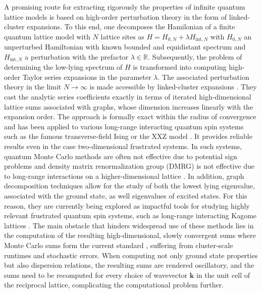\documentclass[]{amsart}
\numberwithin{mythm}{section}
\begin{document}
A promising route for extracting rigorously the properties of infinite quantum lattice models is based on high-order perturbation theory in the form of linked-cluster expansions. To this end, one decomposes the Hamilonian of a finite quantum lattice model with $N$ lattice sites as $H=H_{0,N}+\lambda H_{\mathrm{int},N}$ with $H_{0,N}$ an unperturbed Hamiltonian with known bounded and equidistant spectrum and $H_{\mathrm{int},N}$ a perturbation with the prefactor $\lambda \in \mathds R$. Subsequently, the problem of determining the low-lying spectrum of $H$ is transformed into computing high-order Taylor series expansions in the parameter $\lambda$. 
The associated perturbation theory in the limit $N\to \infty$ is made accessible by linked-cluster expansions  \cite{adelhardt2024monte,hormann2023projective}. 
They cast the analytic series coefficients exactly in terms of iterated high-dimensional lattice sums associated with graphs, whose dimension increases linearly with the expansion order. The approach is formally exact within the radius of convergence and has been applied to various long-range interacting quantum spin systems such as the famous transverse-field Ising \cite{koziol2024order} or the XXZ model \cite{adelhardt2025quantum}. It provides reliable results even in the case two-dimensional frustrated systems. In such systems, quantum Monte Carlo methods are often not effective due to potential sign problems \cite{sandvik2010computational} and density matrix renormalization group (DMRG) is not effective due to long-range interactions on a higher-dimensional lattice \cite{stoudenmire2012studying}. In addition, graph decomposition techniques allow for the study of both the lowest lying eigenvalue, associated with the ground state, as well eigenvalues of excited states. For this reason, they are currently being explored as impactful tools for studying highly relevant frustrated quantum spin systems, such as long-range interacting Kagome lattices \cite{semeghini2021probing,samajdar2021quantum}. The main obstacle that hinders widespread use of these methods lies in the computation of the resulting high-dimensional, slowly convergent sums where Monte Carlo sums form the current standard \cite{adelhardt2024monte}, suffering from cluster-scale runtimes and stochastic errors. When computing not only ground state properties but also dispersion relations, the resulting sums are rendered oscillatory, and the sums need to be recomputed for every choice of wavevector $\bm k$ in the unit cell of the reciprocal lattice, complicating the computational problem further.
\end{document}
